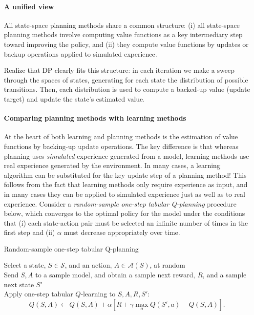 \documentclass[12pt]{article}
\begin{document}
\paragraph{A unified view} All state-space planning methods share a common structure: (i) all state-space planning methods involve computing value functions as a key intermediary step toward improving the policy, and (ii) they compute value functions by updates or backup operations applied to simulated experience.
\begin{figure}[h]
  \centering
\end{figure}
Realize that DP clearly fits this structure: in each iteration we make a sweep through the spaces of states, generating for each state the distribution of possible transitions. Then, each distribution is used to compute a backed-up value (update target) and update the state's estimated value.
\paragraph{Comparing planning methods with learning methods}
At the heart of both learning and planning methods is the estimation of value functions by backing-up update operations. The key difference is that whereas planning uses \emph{simulated} experience generated from a model, learning methods use real experience generated by the environment. In many cases, a learning algorithm can be substituted for the key update step of a planning method! This follows from the fact that learning methods only require experience as input, and in many cases they can be applied to simulated experience just as well as to real experience. Consider a \emph{random-sample one-step tabular Q-planning} procedure below, which converges to the optimal policy for the model under the conditions that (i) each state-action pair must be selected an infinite number of times in the first step and (ii) $\alpha$ must decrease appropriately over time.
\begin{algorithm}[h]
  \caption{Random-sample one-step tabular Q-planning}
   {
    Select a state, $S \in \mathcal S$, and an action, $A \in \mathcal A(S)$, at     random \\
Send $S,A$ to a sample model, and obtain a sample next reward, $R$, and a sample next state $S'$\\
Apply one-step tabular $Q$-learning to $S, A, R, S'$:
\[
  Q(S,A) \gets Q(S,A) + \alpha \left[ R + \gamma \max_a Q(S', a) - Q(S,A)\right].
\]
}
\end{algorithm}
\end{document}
